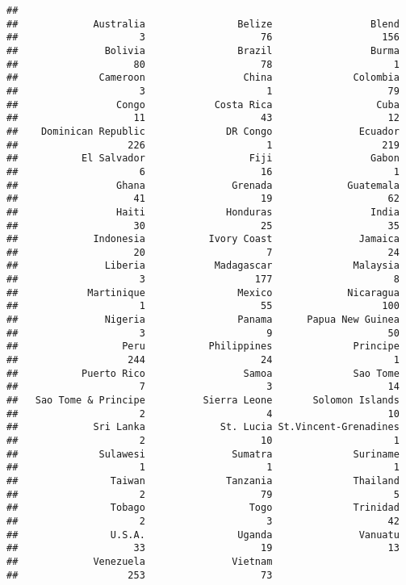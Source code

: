 \documentclass[
]{article}
\begin{document}
\begin{verbatim}
## 
##             Australia                Belize                 Blend 
##                     3                    76                   156 
##               Bolivia                Brazil                 Burma 
##                    80                    78                     1 
##              Cameroon                 China              Colombia 
##                     3                     1                    79 
##                 Congo            Costa Rica                  Cuba 
##                    11                    43                    12 
##    Dominican Republic              DR Congo               Ecuador 
##                   226                     1                   219 
##           El Salvador                  Fiji                 Gabon 
##                     6                    16                     1 
##                 Ghana               Grenada             Guatemala 
##                    41                    19                    62 
##                 Haiti              Honduras                 India 
##                    30                    25                    35 
##             Indonesia           Ivory Coast               Jamaica 
##                    20                     7                    24 
##               Liberia            Madagascar              Malaysia 
##                     3                   177                     8 
##            Martinique                Mexico             Nicaragua 
##                     1                    55                   100 
##               Nigeria                Panama      Papua New Guinea 
##                     3                     9                    50 
##                  Peru           Philippines              Principe 
##                   244                    24                     1 
##           Puerto Rico                 Samoa              Sao Tome 
##                     7                     3                    14 
##   Sao Tome & Principe          Sierra Leone       Solomon Islands 
##                     2                     4                    10 
##             Sri Lanka             St. Lucia St.Vincent-Grenadines 
##                     2                    10                     1 
##              Sulawesi               Sumatra              Suriname 
##                     1                     1                     1 
##                Taiwan              Tanzania              Thailand 
##                     2                    79                     5 
##                Tobago                  Togo              Trinidad 
##                     2                     3                    42 
##                U.S.A.                Uganda               Vanuatu 
##                    33                    19                    13 
##             Venezuela               Vietnam 
##                   253                    73
\end{verbatim}
\end{document}
